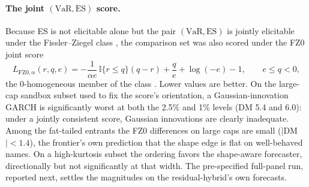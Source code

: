 \documentclass[11pt]{article}
\newcommand{\VaR}{\mathrm{VaR}}
\newcommand{\ES}{\mathrm{ES}}
\theoremstyle{remark}
\begin{document}
\paragraph{The joint $(\VaR,\ES)$ score.} Because ES is not elicitable
alone but the pair $(\VaR,\ES)$ is jointly elicitable under the
Fissler--Ziegel class \citep{fissler2016}, the comparison set was also scored under the FZ0 joint score
\begin{equation}
L_{\mathrm{FZ0},\alpha}(r,q,e)=-\frac{1}{\alpha e}\,\mathbb{I}\{r\le q\}(q-r)
+\frac{q}{e}+\log(-e)-1,\qquad e\le q<0,
\label{eq:fz0}
\end{equation}
the $0$-homogeneous member of the class \citep{patton2019}. Lower values are better. On the
large-cap sandbox subset used to fix the score's orientation, a
Gaussian-innovation GARCH is significantly worst at both the 2.5\% and 1\%
levels (DM 5.4 and 6.0): under a jointly consistent score, Gaussian innovations
are clearly inadequate. Among the fat-tailed entrants the FZ0 differences on
large caps are small ($|$DM$|<1.4$), the frontier's own prediction that the
shape edge is flat on well-behaved names. On a high-kurtosis subset the ordering favors the shape-aware forecaster, directionally but not significantly at that width. The pre-specified full-panel run, reported next, settles the magnitudes on the residual-hybrid's own forecasts.
\end{document}
